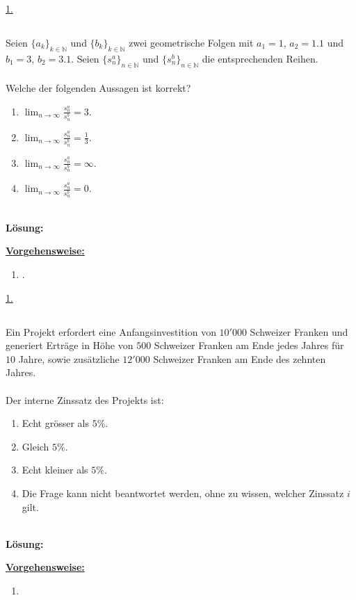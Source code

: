 \underline{1. }\\




\newpage

\subsection*{}
Seien $\{a_k\}_{k \in \mathbb{N}}$ und $\{b_k\}_{k \in \mathbb{N}}$ zwei geometrische Folgen mit $a_1 = 1$, $a_2= 1.1$ und $b_1 = 3$, $b_2 = 3.1$.
Seien $\{s_n^a \}_{n \in \mathbb{N}}$ und $\{s_n^b \}_{n \in \mathbb{N}}$ die entsprechenden Reihen.\\
\\
Welche der folgenden Aussagen ist korrekt? 
\renewcommand{\labelenumi}{(\alph{enumi})}
\begin{enumerate}
	\item 
	$\lim_{n \to \infty} \frac{s_n^a}{s_n^b} = 3$.
	\item
	$\lim_{n \to \infty} \frac{s_n^a}{s_n^b} = \frac{1}{3}$.
	\item
	$\lim_{n \to \infty} \frac{s_n^a}{s_n^b} = \infty$.
	\item
	$\lim_{n \to \infty} \frac{s_n^a}{s_n^b} = 0$.
\end{enumerate}
\ \\
\textbf{Lösung:}
\begin{mdframed}
\underline{\textbf{Vorgehensweise:}}
\renewcommand{\labelenumi}{\theenumi.}
\begin{enumerate}
\item .
\end{enumerate}
\end{mdframed}

\underline{1. }\\


\newpage
\subsection*{}
Ein Projekt erfordert eine Anfangsinvestition von $10'000$ Schweizer Franken und generiert Erträge in Höhe von $500$ Schweizer Franken am Ende jedes Jahres für $10$ Jahre, sowie zusätzliche $12'000$ Schweizer Franken am Ende des zehnten Jahres.\\
\\
Der interne Zinssatz des Projekts ist:
\renewcommand{\labelenumi}{(\alph{enumi})}
\begin{enumerate}
	\item 
	Echt grösser als $5 \%$.
	\item 
	Gleich $5 \%$.
	\item
	Echt kleiner als $5 \%$.
	\item
	Die Frage kann nicht beantwortet werden, ohne zu wissen, welcher Zinssatz $i$ gilt.
\end{enumerate}
\ \\
\textbf{Lösung:}
\begin{mdframed}
\underline{\textbf{Vorgehensweise:}}
\renewcommand{\labelenumi}{\theenumi.}
\begin{enumerate}
\item 
\end{enumerate}
\end{mdframed}

